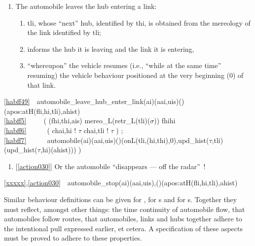 {\begin{enumerate}\setei
\item \label{habff49} The automobile leaves the hub entering a link:
\begin{enumerate} 
\item \label{habff5}  \textsf{tli}, whose ``next'' 
                     hub, identified by \textsf{thi}, is obtained from
                     the mereology of the link identified by \textsf{tli};  
\item \label{habff6} informs the hub it is leaving and the link it is
                     entering,
\item \label{habff7} ``whereupon'' the vehicle resumes (i.e., ``while
                     at the same time'' resuming) the vehicle
                     behaviour positioned at the very beginning
                     (\textsf{0}) of that link.
\end{enumerate}
\savei\end{enumerate}
\bp
\ref{habff49}\ \ automobile\_leave\_hub\_enter\_link(ai)(aai,uis)({\DOTDOTDOT})(apos:atH(fli,hi,tli),ahist) {\IS}\\
\ref{habff5}\ \ \ \ \ ( ({\LBRACE}fhi,thi{\RBRACE},ais) {\EQ} mereo\_L(retr\_L(tli)($\sigma$))   fhi{\EQ}hi\\
\ref{habff6}\ \ \ \ \ \ ( ch{\LBRACKET}ai,hi{\RBRACKET} ! $\tau$ {\PARL} ch{\LBRACKET}ai,tli{\RBRACKET} ! $\tau$ ) ;\\
\ref{habff7}\ \ \ \ \ \ automobile(ai)(aai,uis)({\DOTDOTDOT})(onL(tli,(hi,thi),0),upd\_hist($\tau$,tli)(upd\_hist($\tau$,hi)(ahist))) )
\ep


\mnewfoil

\begin{enumerate}\setei
\item \label{xxxxx} {[\ref{action030}]}  Or the  automobile ``disappears --- off the radar''~!
\savei\end{enumerate}

\bp
\ref{xxxxx},\ref{action030}\ \ automobile\_stop(ai)(aai,uis),({\DOTDOTDOT})(apos:atH(fli,hi,tli),ahist) {\IS} 
\ep
\rm\pos{\normalsize}{\HHHH}

\noindent
\begynd
\pind Similar behaviour definitions can be given for , for s and for s.
\pind Together they must reflect, amongst other things:
\begynd
\pind the time continuity of automobile flow,
\pind that automobiles follow routes,
\pind that automobiles, links and hubs together adhere to the
      intentional pull expressed earlier,
\pind et cetera. 
\afslut
\pind A specification of these aspects must be proved to adhere to
      these properties. 
\afslut
}

